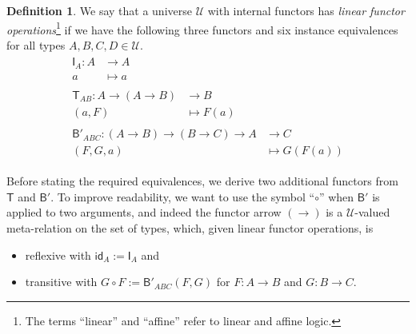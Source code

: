 \documentclass[a4paper]{article}
\theoremstyle{definition}
\newtheorem{definition}{Definition}[section]
\theoremstyle{remark}
\newcommand{\defn}{\emph}
\newcommand{\U}{\mathcal{U}}
\newcommand{\nm}{\mathsf}
\newcommand{\id}{\nm{id}}
\newcommand{\combinator}{\nm}
\newcommand{\idFun}{\combinator{I}}
\newcommand{\revAppFun}{\combinator{T}}
\newcommand{\compFun}{\combinator{B'}}
\begin{document}
\begin{definition}
  We say that a universe $\U$ with internal functors has \defn{linear functor
  operations}\footnote{The terms ``linear'' and ``affine'' refer to linear and affine logic.}
  if we have the following three functors and six instance equivalences for all types
  $A,B,C,D \in \U.$
  \vspace{1ex}
  \begin{gather*}
    \begin{aligned}
      \idFun_A : A &\to     A\\
                 a &\mapsto a
    \end{aligned}\\[1em]
    \begin{aligned}
      \revAppFun_{AB} : A \to (A \to B) &\to     B\\
                        (a,F)           &\mapsto F(a)
    \end{aligned}\\[1em]
    \begin{aligned}
      \compFun_{ABC} : (A \to B) \to (B \to C) \to A &\to     C\\
                       (F,G,a)                       &\mapsto G(F(a))
    \end{aligned}
  \end{gather*}

  Before stating the required equivalences, we derive two additional functors from $\revAppFun$
  and $\compFun.$
  To improve readability, we want to use the symbol ``$\circ$'' when $\compFun$ is applied to
  two arguments, and indeed the functor arrow $(\to)$ is a $\U$-valued meta-relation on the
  set of types, which, given linear functor operations, is
  \begin{itemize}
    \item reflexive with $\id_A := \idFun_A$ and
    \item transitive with $G \circ F := \compFun_{ABC}(F,G)$ for $F : A \to B$ and
    $G : B \to C.$
  \end{itemize}


\end{definition}
\end{document}
